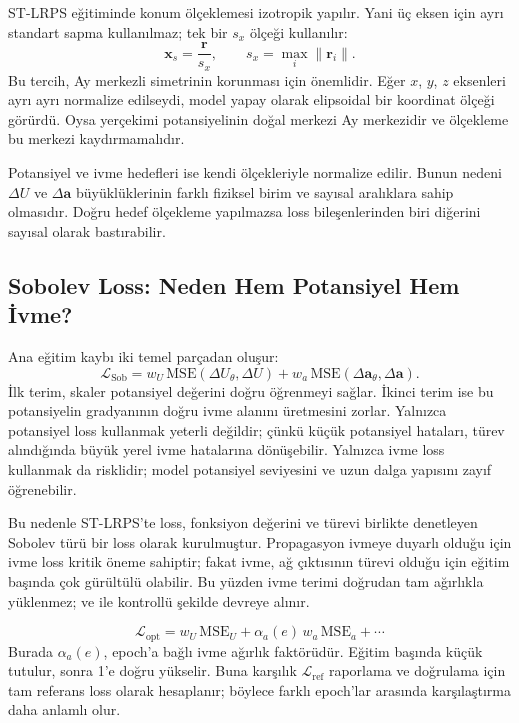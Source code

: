 ST-LRPS eğitiminde konum ölçeklemesi izotropik yapılır. Yani üç eksen için ayrı standart sapma kullanılmaz; tek bir \(s_x\) ölçeği kullanılır:
\[
\mathbf{x}_{s}=\frac{\mathbf{r}}{s_x},
\qquad
s_x=\max_i \|\mathbf{r}_i\|.
\]
Bu tercih, Ay merkezli simetrinin korunması için önemlidir. Eğer \(x\), \(y\), \(z\) eksenleri ayrı ayrı normalize edilseydi, model yapay olarak elipsoidal bir koordinat ölçeği görürdü. Oysa yerçekimi potansiyelinin doğal merkezi Ay merkezidir ve ölçekleme bu merkezi kaydırmamalıdır.

Potansiyel ve ivme hedefleri ise kendi ölçekleriyle normalize edilir. Bunun nedeni \(\Delta U\) ve \(\Delta\mathbf{a}\) büyüklüklerinin farklı fiziksel birim ve sayısal aralıklara sahip olmasıdır. Doğru hedef ölçekleme yapılmazsa loss bileşenlerinden biri diğerini sayısal olarak bastırabilir.

\subsection{Sobolev Loss: Neden Hem Potansiyel Hem İvme?}

Ana eğitim kaybı iki temel parçadan oluşur:
\[
\mathcal{L}_{\mathrm{Sob}}
=
w_U\,\mathrm{MSE}(\Delta U_{\theta},\Delta U)
+
w_a\,\mathrm{MSE}(\Delta\mathbf{a}_{\theta},\Delta\mathbf{a}).
\]
İlk terim, skaler potansiyel değerini doğru öğrenmeyi sağlar. İkinci terim ise bu potansiyelin gradyanının doğru ivme alanını üretmesini zorlar. Yalnızca potansiyel loss kullanmak yeterli değildir; çünkü küçük potansiyel hataları, türev alındığında büyük yerel ivme hatalarına dönüşebilir. Yalnızca ivme loss kullanmak da risklidir; model potansiyel seviyesini ve uzun dalga yapısını zayıf öğrenebilir.

Bu nedenle ST-LRPS'te loss, fonksiyon değerini ve türevi birlikte denetleyen Sobolev türü bir loss olarak kurulmuştur. Propagasyon ivmeye duyarlı olduğu için ivme loss kritik öneme sahiptir; fakat ivme, ağ çıktısının türevi olduğu için eğitim başında çok gürültülü olabilir. Bu yüzden ivme terimi doğrudan tam ağırlıkla yüklenmez;  ve  ile kontrollü şekilde devreye alınır.

\[
\mathcal{L}_{\mathrm{opt}}
=
w_U\,\mathrm{MSE}_U
+
\alpha_a(e)\,w_a\,\mathrm{MSE}_a
+ \cdots
\]
Burada \(\alpha_a(e)\), epoch'a bağlı ivme ağırlık faktörüdür. Eğitim başında küçük tutulur, sonra 1'e doğru yükselir. Buna karşılık \(\mathcal{L}_{\mathrm{ref}}\) raporlama ve doğrulama için tam referans loss olarak hesaplanır; böylece farklı epoch'lar arasında karşılaştırma daha anlamlı olur.

